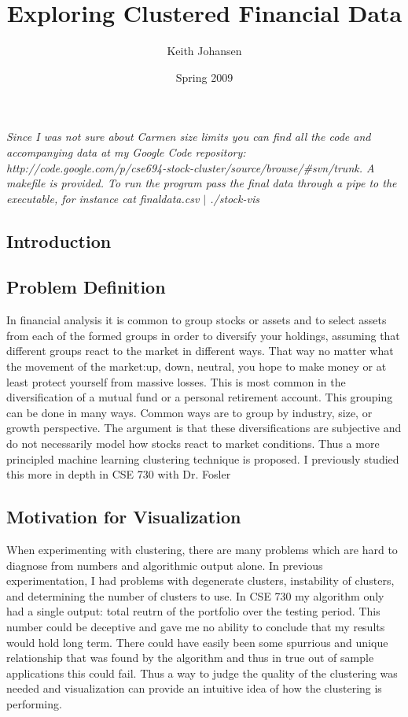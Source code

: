 \documentclass{article}
\author{Keith Johansen}
\title{Exploring Clustered Financial Data}
\date{Spring 2009}
\begin{document}
\maketitle


\noindent \textit{Since I was not sure about Carmen size limits you can find all the code and accompanying data at my Google Code repository: http://code.google.com/p/cse694-stock-cluster/source/browse/\#svn/trunk. A makefile is provided.  To run the program pass the final data through a pipe to the executable, for instance cat finaldata.csv $|$ ./stock-vis}
\begin{multicols}{2}
\section{Introduction}
\subsection{Problem Definition}
In financial analysis it is common to group stocks or assets and to select assets from each of the formed groups in order to diversify your holdings, assuming that different groups react to the market in different ways.  That way no matter what the movement of the market:up, down, neutral, you hope to make money or at least protect yourself from massive losses.   This is most common in the diversification of a mutual fund or a personal retirement account.  This grouping can be done in many ways.  Common ways are to group by industry, size, or growth perspective.  The argument is that these diversifications are subjective and do not necessarily model how stocks react to market conditions.  Thus a more principled machine learning clustering technique is proposed. I previously studied this more in depth in CSE 730 with Dr. Fosler

\subsection{Motivation for Visualization}
When experimenting with clustering, there are many problems which are hard to diagnose from numbers and algorithmic output alone.  In previous experimentation, I had problems with degenerate clusters, instability of clusters, and determining the number of clusters to use.  In CSE 730 my algorithm only had a single output: total reutrn of the portfolio over the testing period.  This number could be deceptive and gave me no ability to conclude that my results would hold long term.  There could have easily been some spurrious and unique relationship that was found by the algorithm and thus in true out of sample applications this could fail.  Thus a way to judge the quality of the clustering was needed and visualization can provide an intuitive idea of how the clustering is performing.

\end{multicols}
\end{document}
